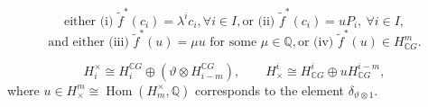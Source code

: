 \documentclass{amsart}
\renewcommand{\hom}{\mathrm{Hom}}
\begin{document}
	\begin{equation}
		\text{either (i) } 
		\tilde f^*(c_i) = \lambda^i c_i,\forall i\in I, \text{or (ii) } \tilde f^*(c_i)=uP_i, \  \forall i\in I , 
	\end{equation}
	\begin{equation}
		\text{and either (iii) }\tilde f^*(u) = \mu u \text{ for some }\mu\in \mathbb Q, \text{or (iv) }\tilde f^*(u) \in H^m_{\mathbb{C}G}.
	\end{equation}
	
	
	
	\fi  
	\begin{equation}\label{kunneth}
		H_i^\times \cong H_i^{\mathbb{C}G} \oplus (\vartheta \otimes H_{i-m}^{\mathbb{C}G}), 
		\qquad 
		H^i_\times \cong H^i_{\mathbb{C}G} \oplus uH^{i-m}_{\mathbb{C}G},
	\end{equation}
	where  $u \in H^m_{\times} \cong \operatorname{Hom}(H_m^{\times}, \mathbb Q)$ corresponds to the element $\delta_{\vartheta\otimes 1}$.
	
\end{document}
